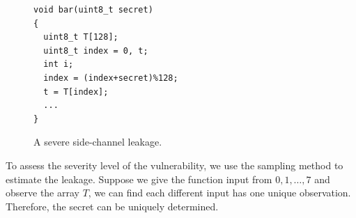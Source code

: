 \begin{figure}[h]
  \begin{minipage}{0.49\linewidth}
    \begin{lstlisting}[xleftmargin=.05\textwidth,xrightmargin=.08\textwidth]
void bar(uint8_t secret)
{
  uint8_t T[128];
  uint8_t index = 0, t;
  int i;
  index = (index+secret)%128;
  t = T[index];
  ...
}
\end{lstlisting}
  \end{minipage}
  \hfill
  \begin{minipage}{0.42\linewidth}
  \end{minipage}
  \caption{A severe side-channel leakage.}\label{chapter5:fig:example1}
\end{figure}

To assess the severity level of the vulnerability, we use the sampling method to estimate the leakage. Suppose we give the function input from $0, 1, \dots, 7$ and observe the array $T$, we can find each different input has one unique observation. Therefore, the secret can be uniquely determined.

